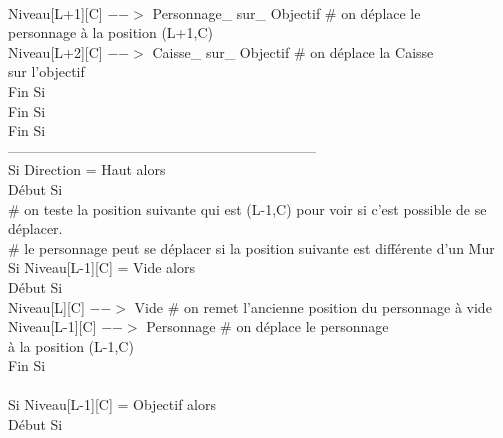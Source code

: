 \documentclass{article}
\begin{document}
\begin{tabbing}
\\	\hspace{5cm}			Niveau[L+1][C] $-->$ Personnage\_ sur\_ Objectif     \# on déplace le
\\ \hspace{5cm} personnage à la position (L+1,C)
\\	\hspace{5cm}			Niveau[L+2][C] $-->$ Caisse\_ sur\_ Objectif		\# on déplace la Caisse
\\ \hspace{5cm} sur l'objectif
\\	\hspace{4cm}		Fin Si
\\	\hspace{3cm}	Fin Si 
\\	\hspace{2cm} Fin Si 
\\------------------------------------------------------------------
\\	\hspace{2cm} Si Direction = Haut alors
\\	\hspace{2cm} Début Si
\\	\hspace{3cm}	\# on teste la position suivante qui est (L-1,C)	pour voir si c'est possible de se déplacer.
\\	\hspace{3cm}	\# le personnage peut se déplacer si la position suivante est différente d'un Mur			
\\	\hspace{3cm}	Si Niveau[L-1][C] = Vide alors			
\\	\hspace{3cm}	Début Si
\\	\hspace{4cm}		Niveau[L][C] $-->$ Vide 		\# on remet l'ancienne position du personnage à vide
\\	\hspace{4cm}		Niveau[L-1][C] $-->$ Personnage	\# on déplace le personnage
\\ \hspace{4cm} à la position (L-1,C)
\\	\hspace{3cm}	Fin Si 
\\		
\\	\hspace{3cm}	Si Niveau[L-1][C] = Objectif alors			
\\	\hspace{3cm}	Début Si

\end{tabbing}
\end{document}
